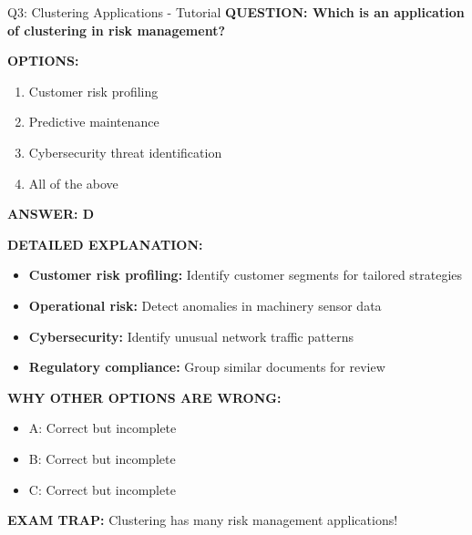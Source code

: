 \documentclass[8pt]{beamer}
\begin{document}
	\begin{frame}{Q3: Clustering Applications - Tutorial}
		\fontsize{6.5}{7.5}\selectfont
		\textbf{QUESTION: Which is an application of clustering in risk management?}
		
		\vspace{0.1cm}
		\textbf{OPTIONS:}
		\begin{enumerate}
			\item Customer risk profiling
			\item Predictive maintenance
			\item Cybersecurity threat identification
			\item All of the above
		\end{enumerate}
		
		\vspace{0.1cm}
		\textcolor{myblue}{\textbf{ANSWER: D}}
		
		\vspace{0.1cm}
		\textbf{DETAILED EXPLANATION:}
		\begin{itemize}
			\item \textbf{Customer risk profiling:} Identify customer segments for tailored strategies
			\item \textbf{Operational risk:} Detect anomalies in machinery sensor data
			\item \textbf{Cybersecurity:} Identify unusual network traffic patterns
			\item \textbf{Regulatory compliance:} Group similar documents for review
		\end{itemize}
		
		\vspace{0.1cm}
		\textcolor{myred}{\textbf{WHY OTHER OPTIONS ARE WRONG:}}
		\begin{itemize}
			\item \textcolor{myred}{A:} Correct but incomplete
			\item \textcolor{myred}{B:} Correct but incomplete
			\item \textcolor{myred}{C:} Correct but incomplete
		\end{itemize}
		
		\textcolor{myred}{\textbf{EXAM TRAP:}} Clustering has \textcolor{myblue}{many risk management applications}!
	\end{frame}
	
\end{document}
